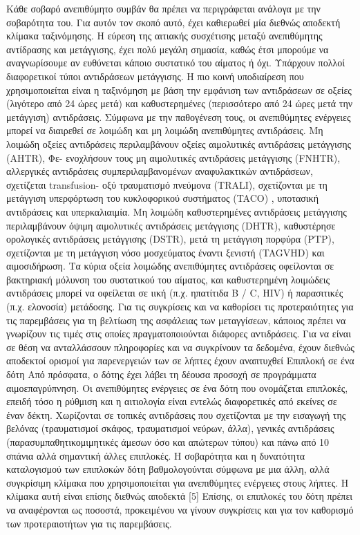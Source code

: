  	Κάθε σοβαρό ανεπιθύμητο συμβάν θα πρέπει να περιγράφεται ανάλογα με την σοβαρότητα του. Για αυτόν τον σκοπό αυτό, έχει καθιερωθεί μία διεθνώς αποδεκτή κλίμακα ταξινόμησης. Η εύρεση της αιτιακής συσχέτισης μεταξύ ανεπιθύμητης αντίδρασης και μετάγγισης, έχει πολύ μεγάλη σημασία, καθώς έτσι μπορούμε να αναγνωρίσουμε αν ευθύνεται κάποιο συστατικό του αίματος ή όχι. Υπάρχουν πολλοί διαφορετικοί τύποι αντιδράσεων μετάγγισης. Η πιο κοινή υποδιαίρεση που χρησιμοποιείται είναι η ταξινόμηση με βάση την εμφάνιση των αντιδράσεων σε οξείες (λιγότερο από 24 ώρες μετά) και καθυστερημένες (περισσότερο από 24 ώρες μετά την μετάγγιση) αντιδράσεις.
 	 Σύμφωνα με την παθογένεση τους, οι ανεπιθύμητες ενέργειες μπορεί να διαιρεθεί σε λοιμώδη και μη λοιμώδη ανεπιθύμητες αντιδράσεις. Μη λοιμώδη οξείες αντιδράσεις περιλαμβάνουν οξείες αιμολυτικές αντιδράσεις μετάγγισης (AHTR), Φε- ενοχλήσουν τους μη αιμολυτικές αντιδράσεις μετάγγισης (FNHTR), αλλεργικές αντιδράσεις συμπεριλαμβανομένων αναφυλακτικών αντιδράσεων, σχετίζεται transfusion- οξύ τραυματισμό πνεύμονα (TRALI), σχετίζονται με τη μετάγγιση υπερφόρτωση του κυκλοφορικού συστήματος (TACO) , υποτασική αντιδράσεις και υπερκαλιαιμία. Μη λοιμώδη καθυστερημένες αντιδράσεις μετάγγισης περιλαμβάνουν όψιμη αιμολυτικές αντιδράσεις μετάγγισης (DHTR), καθυστέρησε ορολογικές αντιδράσεις μετάγγισης (DSTR), μετά τη μετάγγιση πορφύρα (PTP), σχετίζονται με τη μετάγγιση νόσο μοσχεύματος έναντι ξενιστή (TAGVHD) και αιμοσιδήρωση.
Τα κύρια οξεία λοιμώδης ανεπιθύμητες αντιδράσεις οφείλονται σε βακτηριακή μόλυνση του συστατικού του αίματος, και καθυστερημένη λοιμώδεις αντιδράσεις μπορεί να οφείλεται σε ιική (π.χ. ηπατίτιδα B / C, HIV) ή παρασιτικές (π.χ. ελονοσία) μετάδοσης.
Για τις συγκρίσεις και να καθορίσει τις προτεραιότητες για τις παρεμβάσεις για τη βελτίωση της ασφάλειας των μεταγγίσεων, κάποιος πρέπει να γνωρίζουν τις τιμές στις οποίες πραγματοποιούνται διάφορες αντιδράσεις.
Για να είναι σε θέση να ανταλλάσσουν πληροφορίες και να συγκρίνουν τα δεδομένα, έχουν διεθνώς αποδεκτοί ορισμοί για παρενεργειών των σε λήπτες έχουν αναπτυχθεί 
Επιπλοκή σε ένα δότη
Από πρόσφατα, ο δότης έχει λάβει τη δέουσα προσοχή σε προγράμματα αιμοεπαγρύπνηση. Οι ανεπιθύμητες ενέργειες σε ένα δότη που ονομάζεται επιπλοκές, επειδή τόσο η ρύθμιση και η αιτιολογία είναι εντελώς διαφορετικές από εκείνες σε έναν δέκτη. Χωρίζονται σε τοπικές αντιδράσεις που σχετίζονται με την εισαγωγή της βελόνας (τραυματισμοί σκάφος, τραυματισμοί νεύρων, άλλα), γενικές αντιδράσεις (παρασυμπαθητικομιμητικές άμεσων όσο και απώτερων τύπου) και πάνω από 10 σπάνια αλλά σημαντική άλλες επιπλοκές. Η σοβαρότητα και η δυνατότητα καταλογισμού των επιπλοκών δότη βαθμολογούνται σύμφωνα με μια άλλη, αλλά συγκρίσιμη κλίμακα που χρησιμοποιείται για ανεπιθύμητες ενέργειες στους λήπτες. Η κλίμακα αυτή είναι επίσης διεθνώς αποδεκτά [5] 
 Επίσης, οι επιπλοκές του δότη πρέπει να αναφέρονται ως ποσοστά, προκειμένου να γίνουν συγκρίσεις και για τον καθορισμό των προτεραιοτήτων για τις παρεμβάσεις.	 
